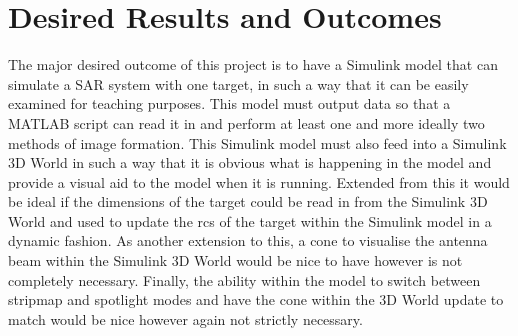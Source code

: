 \section{Desired Results and Outcomes}
The major desired outcome of this project is to have a Simulink model that can simulate a SAR system with one target, in such a way that it can be easily examined for teaching purposes. This model must output data so that a MATLAB script can read it in and perform at least one and more ideally two methods of image formation. This Simulink model must also feed into a Simulink 3D World in such a way that it is obvious what is happening in the model and provide a visual aid to the model when it is running. Extended from this it would be ideal if the dimensions of the target could be read in from the Simulink 3D World and used to update the \gls{rcs} of the target within the Simulink model in a dynamic fashion. As another extension to this, a cone to visualise the antenna beam within the Simulink 3D World would be nice to have however is not completely necessary. Finally, the ability within the model to switch between stripmap and spotlight modes and have the cone within the 3D World update to match would be nice however again not strictly necessary. 
